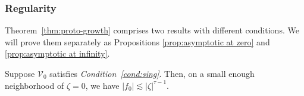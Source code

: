 \documentclass[review]{siamart220329}
\newcommand{\hardpart}{\mathcal{V}_0}
\newcommand{\solproto}{f_0}
\begin{document}
\subsubsection{Regularity}\label{sec:asymptotics}
Theorem~\ref{thm:proto-growth} comprises two results with different conditions. We will prove them separately as Propositions \ref{prop:asymptotic at zero} and \ref{prop:asymptotic at infinity}.
\begin{proposition}\label{prop:asymptotic at zero}
Suppose $\hardpart$ satisfies {\em Condition~\eqref{cond:sing}}. Then, on a small enough neighborhood of $\zeta = 0$, we have $|\solproto| \lesssim |\zeta|^{\tau-1}$.
\end{proposition}
\end{document}
